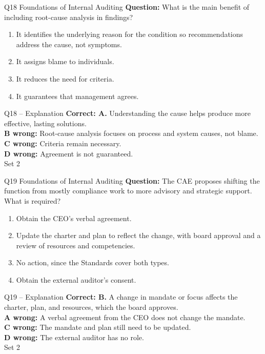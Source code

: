 \documentclass[aspectratio=169,10pt]{beamer}
\begin{document}
\begin{frame}[t]{Q18 \hfill {\scriptsize Foundations of Internal Auditing}}
	\small
	\textbf{Question:} What is the main benefit of including root-cause analysis in findings?
	\begin{enumerate}[label=\Alph*.,itemsep=1pt,topsep=3pt]
			\item It identifies the underlying reason for the condition so recommendations address the cause, not symptoms.
			\item It assigns blame to individuals.
			\item It reduces the need for criteria.
			\item It guarantees that management agrees.
	\end{enumerate}
\end{frame}

\begin{frame}[t]{Q18 -- Explanation}
	\footnotesize
	\textbf{Correct: A.} Understanding the cause helps produce more effective, lasting solutions. \\[5pt]
\textbf{B wrong:} Root-cause analysis focuses on process and system causes, not blame. \\[3pt]
\textbf{C wrong:} Criteria remain necessary. \\[3pt]
\textbf{D wrong:} Agreement is not guaranteed. \\[3pt]
	\vfill {\tiny Set 2}
\end{frame}

\begin{frame}[t]{Q19 \hfill {\scriptsize Foundations of Internal Auditing}}
	\small
	\textbf{Question:} The CAE proposes shifting the function from mostly compliance work to more advisory and strategic support. What is required?
	\begin{enumerate}[label=\Alph*.,itemsep=1pt,topsep=3pt]
			\item Obtain the CEO's verbal agreement.
			\item Update the charter and plan to reflect the change, with board approval and a review of resources and competencies.
			\item No action, since the Standards cover both types.
			\item Obtain the external auditor's consent.
	\end{enumerate}
\end{frame}

\begin{frame}[t]{Q19 -- Explanation}
	\footnotesize
	\textbf{Correct: B.} A change in mandate or focus affects the charter, plan, and resources, which the board approves. \\[5pt]
\textbf{A wrong:} A verbal agreement from the CEO does not change the mandate. \\[3pt]
\textbf{C wrong:} The mandate and plan still need to be updated. \\[3pt]
\textbf{D wrong:} The external auditor has no role. \\[3pt]
	\vfill {\tiny Set 2}
\end{frame}
\end{document}
